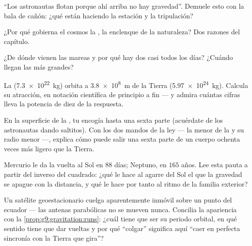 \begin{exercise}[$\star$]\label{exo:g9:gravitation:6}
``Los astronautas flotan porque ahí arriba no hay gravedad''.
Demuele esto con la bala de cañón: ¿qué están haciendo la estación y la
tripulación?
\end{exercise}

\begin{exercise}[$\star$]\label{exo:g9:gravitation:7}
¿Por qué gobierna el cosmos la , la enclenque de la
naturaleza? Dos razones del capítulo.
\end{exercise}

\begin{exercise}[$\star$]\label{exo:g9:gravitation:8}
¿De dónde vienen las mareas y por qué hay dos casi todos los días?
¿Cuándo llegan las más grandes?
\end{exercise}

\begin{exercise}[$\star\star$]\label{exo:g9:gravitation:9}
La  (\qty{7.3e22}{kg}) orbita a \qty{3.8e8}{m} de la
Tierra (\qty{5.97e24}{kg}). Calcula su atracción, en notación
científica de principio a fin --- y admira cuántas cifras lleva la
potencia de diez de la respuesta.
\end{exercise}

\begin{exercise}[$\star\star$]\label{exo:g9:gravitation:10}
En la superficie de la , tu  encogía hasta una
sexta parte (acuérdate de los astronautas dando saltitos). Con los dos
mandos de la ley --- la  menor de la  y su radio
menor ---, explica cómo puede salir una sexta parte de un cuerpo ochenta
veces más ligero que la Tierra.
\end{exercise}

\begin{exercise}[$\star\star$]\label{exo:g9:gravitation:11}
Mercurio le da la vuelta al Sol en $88$ días; Neptuno, en $165$ años.
Lee esta pauta a partir del inverso del cuadrado: ¿qué le hace al
agarre del Sol el que la gravedad se apague con la distancia, y qué le
hace por tanto al ritmo de la familia exterior?
\end{exercise}

\begin{exercise}[$\star\star\star$]\label{exo:g9:gravitation:12}
Un satélite geoestacionario cuelga aparentemente inmóvil sobre un punto
del ecuador --- las antenas parabólicas no se mueven nunca. Concilia la
apariencia con la \cref{prop:g9:gravitation:runs}: ¿cuál tiene que ser
su periodo orbital, en qué sentido tiene que dar vueltas y por qué
``colgar'' significa aquí ``caer en perfecta sincronía con la Tierra que
gira''?
\end{exercise}

